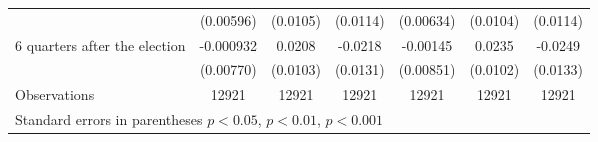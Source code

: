 \begin{table}[!ht]
\begin{tabular}{l*{6}{c}}
                    &   (0.00596)         &    (0.0105)         &    (0.0114)         &   (0.00634)         &    (0.0104)         &    (0.0114)         \\
[0,5em]
 6 quarters after the election&   -0.000932         &      0.0208\sym{*}  &     -0.0218         &    -0.00145         &      0.0235\sym{*}  &     -0.0249         \\
                    &   (0.00770)         &    (0.0103)         &    (0.0131)         &   (0.00851)         &    (0.0102)         &    (0.0133)         \\
\hline
Observations        &       12921         &       12921         &       12921         &       12921         &       12921         &       12921         \\
\hline\hline
\multicolumn{7}{l}{\footnotesize Standard errors in parentheses \sym{*} \(p<0.05\), \sym{**} \(p<0.01\), \sym{***} \(p<0.001\)}\\
\end{tabular}
\end{table}
